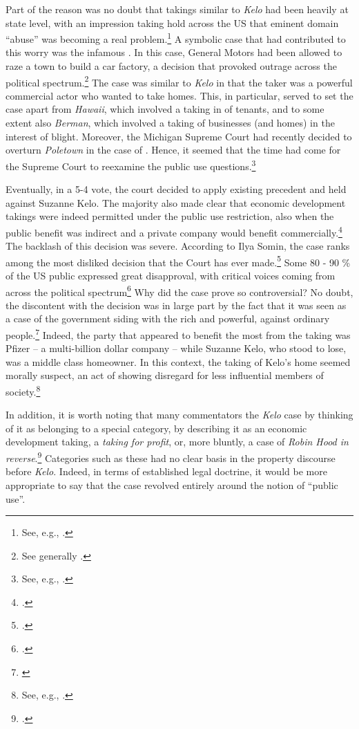 Part of the reason was no doubt that takings similar to {\it Kelo} had been heavily  at state level, with an impression taking hold across the US that eminent domain ``abuse'' was becoming a real problem.\footnote{See, e.g., \cite[667-669]{sandefur05}.} A symbolic case that had contributed to this worry was the infamous \textcite{poletown81}. In this case, General Motors had been allowed to raze a town to build a car factory, a decision that provoked outrage across the political spectrum.\footnote{See generally \cite{sandefur05}.} The case was similar to {\it Kelo} in that the taker was a powerful commercial actor who wanted to take homes. This, in particular, served to set the case apart from  {\it Hawaii}, which involved a taking in  of tenants, and to some extent also {\it Berman}, which involved a taking of businesses (and homes) in the interest of  blight. Moreover, the Michigan Supreme Court had recently decided to overturn {\it Poletown} in the case of \textcite{wayne04}. Hence, it seemed that the time had come for the Supreme Court to reexamine the public use questions.\footnote{See, e.g., \cite{sandefur05,claeys04}.}

Eventually, in a 5-4 vote, the court decided to apply existing precedent and held against Suzanne Kelo. The majority also made clear that economic development takings were indeed permitted under the public use restriction, also when the public benefit was indirect and a private company would benefit commercially.\footcite[469-470]{kelo05} The backlash of this decision was severe. According to Ilya Somin, the case ranks among the most disliked decision that the Court has ever made.\footcite[2]{somin11} Some 80 - 90 \% of the US public expressed great disapproval, with critical voices coming from across the political spectrum\footcite[2108-2110]{somin09} Why did the case prove so controversial? No doubt, the discontent with the decision was  in large part by the fact that it was seen as a case of the government siding with the rich and powerful, against ordinary people.\footnote{\cite[630-634]{baron07}} Indeed, the party that appeared to benefit the most from the taking was Pfizer -- a multi-billion dollar company -- while Suzanne Kelo, who stood to lose, was a middle class homeowner. In this context, the taking of Kelo's home seemed morally suspect, an act of  showing disregard for less influential members of society.\footnote{See, e.g., \cite{underkuffler06}.}

In addition, it is worth noting that many commentators  the {\it Kelo} case by thinking of it as belonging to a special category, by describing it as an economic development taking, a {\it taking for profit}, or, more bluntly, a case of {\it Robin Hood in reverse}.\footcite{somin05} Categories such as these had no clear basis in the property discourse before {\it Kelo}. Indeed, in terms of established legal doctrine, it would be more appropriate to say that the case revolved entirely around the notion of ``public use''. 

